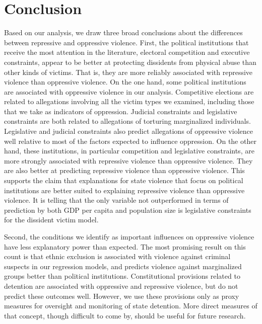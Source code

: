 \documentclass[11pt]{article}
\begin{document}

\section*{Conclusion}

Based on our analysis, we draw three broad conclusions about the differences between repressive and oppressive violence. First, the political institutions that receive the most attention in the literature, electoral competition and executive constraints, appear to be better at protecting dissidents from physical abuse than other kinds of victims. That is, they are more reliably associated with repressive violence than oppressive violence. On the one hand, some political institutions are associated with oppressive violence in our analysis. Competitive elections are related to allegations involving all the victim types we examined, including those that we take as indicators of oppression. Judicial constraints and legislative constraints are both related to allegations of torturing marginalized individuals. Legislative and judicial constraints also predict allegations of oppressive violence well relative to most of the factors expected to influence oppression. On the other hand, these institutions, in particular competition and legislative constraints, are more strongly associated with repressive violence than oppressive violence. They are also better at predicting repressive violence than oppressive violence. This supports the claim that explanations for state violence that focus on political institutions are better suited to explaining repressive violence than oppressive violence. It is telling that the only variable not outperformed in terms of prediction by both GDP per capita and population size is legislative constraints for the dissident victim model. 

Second, the conditions we identify as important influences on oppressive violence have less explanatory power than expected. The most promising result on this count is that ethnic exclusion is associated with violence against criminal suspects in our regression models, and predicts violence against marginalized groups better than political institutions. Constitutional provisions related to detention are associated with oppressive and repressive violence, but do not predict these outcomes well. However, we use these provisions only as proxy measures for oversight and monitoring of state detention. More direct measures of that concept, though difficult to come by, should be useful for future research.     
\end{document}
